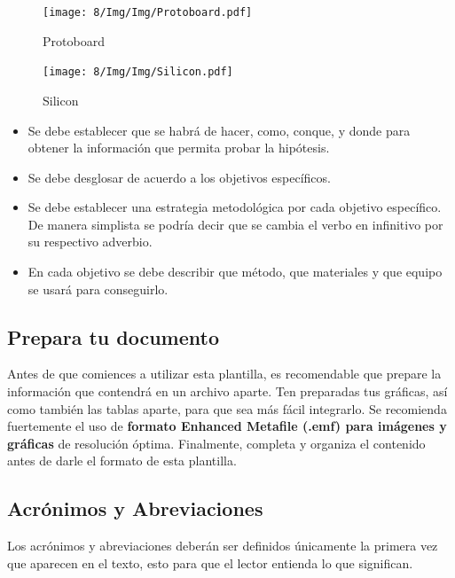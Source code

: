     \begin{figure}[H]
        \centering
        \texttt{[image: 8/Img/Img/Protoboard.pdf]}
        \caption{Protoboard}
        \label{Protoboard}
    \end{figure}
    
    \begin{figure}[H]
        \centering
        \texttt{[image: 8/Img/Img/Silicon.pdf]}
        \caption{Silicon}
        \label{Siliconl}
    \end{figure}
    \begin{itemize}
        \item Se debe establecer que se habrá de hacer, como, conque, y donde para obtener la información que permita probar la hipótesis.  
        \item Se debe desglosar de acuerdo a los objetivos específicos. 
        \item Se debe establecer una estrategia metodológica por cada objetivo específico. De manera simplista se podría decir que se cambia el verbo en infinitivo por su respectivo adverbio.
        \item En cada objetivo se debe describir que método, que materiales y que equipo se usará para conseguirlo.
    \end{itemize}
    
    \subsection{Prepara tu documento}
    
    Antes de que comiences a utilizar esta plantilla, es recomendable que prepare la información que contendrá en un archivo aparte. 
    Ten preparadas tus gráficas, así como también las tablas aparte, para que sea más fácil integrarlo. 
    Se recomienda fuertemente el uso de \textbf{formato Enhanced Metafile (.emf) para imágenes y gráficas} de resolución óptima. 
    Finalmente, completa y organiza el contenido antes de darle el formato de esta plantilla. 
    
    \subsection{Acrónimos y Abreviaciones}
    
    Los acrónimos y abreviaciones deberán ser definidos únicamente la primera vez que aparecen en el texto, esto para que el lector entienda lo que significan.
    
